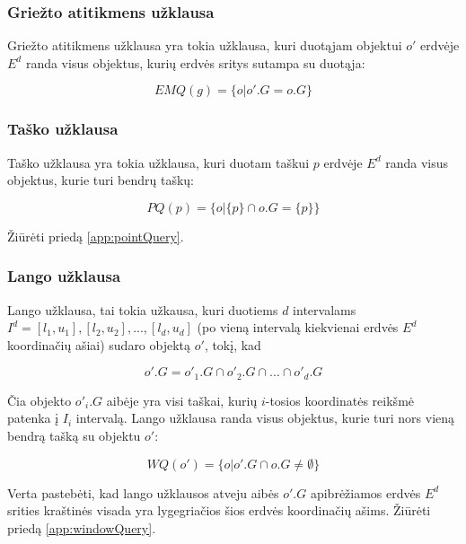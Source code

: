 \subsubsection{Griežto atitikmens užklausa}
Griežto atitikmens užklausa yra tokia užklausa, kuri duotąjam objektui $o'$ erdvėje $E^d$ randa visus objektus, kurių erdvės sritys sutampa su duotąja:

\begin{equation}
	EMQ(g) = \{ o | o'.G = o.G \}
\label{eq:ExactMatchQuery}
\end{equation}

\subsubsection{Taško užklausa}
Taško užklausa yra tokia užklausa, kuri duotam taškui $p$ erdvėje $E^d$ randa visus objektus, kurie turi bendrų taškų:

\begin{equation}
	PQ(p) = \{ o | \{p\} \cap o.G = \{p\} \}
\label{eq:ExactMatchQuery}
\end{equation}

Žiūrėti priedą \ref{app:pointQuery}.

\subsubsection{Lango užklausa}
Lango užklausa, tai tokia užkausa, kuri duotiems $d$ intervalams $I^d = [l_1, u_1], [l_2, u_2], ..., [l_d, u_d]$ (po vieną intervalą kiekvienai erdvės $E^d$ koordinačių ašiai) sudaro objektą $o'$, tokį, kad

\begin{equation}
	o'.G = o'_1.G \cap o'_2.G \cap ... \cap o'_d.G
\end{equation}

Čia objekto $o'_i.G$ aibėje yra visi taškai, kurių $i$-tosios koordinatės reikšmė patenka į $I_i$ intervalą.
Lango užklausa randa visus objektus, kurie turi nors vieną bendrą tašką su objektu $o'$:

\begin{equation}
	WQ(o') = \{ o | o'.G \cap o.G \neq \emptyset \}
\label{eq:ExactMatchQuery}
\end{equation}

Verta pastebėti, kad lango užklausos atveju aibės $o'.G$ apibrėžiamos erdvės $E^d$ srities kraštinės visada yra lygegriačios šios erdvės koordinačių ašims.
Žiūrėti priedą \ref{app:windowQuery}.


